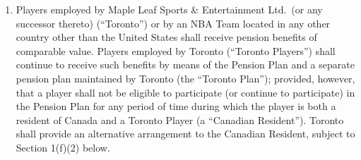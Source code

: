 \documentclass[
]{book}
\begin{document}
\begin{enumerate}
  \begin{enumerate}
  \def\labelenumii{(\arabic{enumii})}
  \item
    Players employed by Maple Leaf Sports \& Entertainment Ltd.~(or any successor thereto) (``Toronto'') or by an NBA Team located in any other country other than the United States shall receive pension benefits of comparable value. Players employed by Toronto (``Toronto Players'') shall continue to receive such benefits by means of the Pension Plan and a separate pension plan maintained by Toronto (the ``Toronto Plan''); provided, however, that a player shall not be eligible to participate (or continue to participate) in the Pension Plan for any period of time during which the player is both a resident of Canada and a Toronto Player (a ``Canadian Resident''). Toronto shall provide an alternative arrangement to the Canadian Resident, subject to Section 1(f)(2) below.


\end{enumerate}
\end{enumerate}
\end{document}
